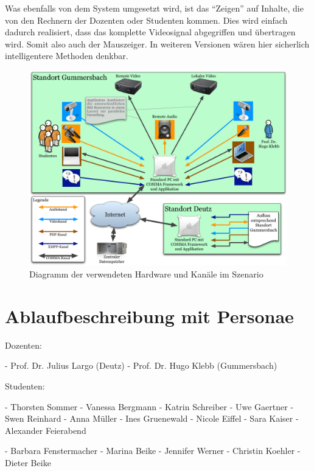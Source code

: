 Was ebenfalls von dem System umgesetzt wird, ist das "`Zeigen"' auf Inhalte, die von den Rechnern der Dozenten oder Studenten kommen. Dies wird einfach dadurch realisiert, dass das komplette Videosignal abgegriffen und übertragen wird. Somit also auch der Mauszeiger. In weiteren Versionen wären hier sicherlich intelligentere Methoden denkbar.

\begin{figure}[htbp]
  \centering
    \includegraphics[width=.9\textwidth]{images/Hardware_und_Kanaele.pdf}
  \caption{Diagramm der verwendeten Hardware und Kanäle im Szenario}
  \label{fig:images_Hardware_und_Kanaele}
\end{figure}



\section{Ablaufbeschreibung mit Personae} %
\label{sec:ablaufbeschreibung_mit_personae}

Dozenten:
  
  - Prof. Dr. Julius Largo (Deutz)
  - Prof. Dr. Hugo Klebb (Gummersbach)
  
Studenten:

- Thorsten Sommer
- Vanessa Bergmann
- Katrin Schreiber
- Uwe Gaertner
- Swen Reinhard
- Anna Müller
- Ines Gruenewald
- Nicole Eiffel
- Sara Kaiser
- Alexander Feierabend

- Barbara Fenstermacher
- Marina Beike
- Jennifer Werner
- Christin Koehler
- Dieter Beike


